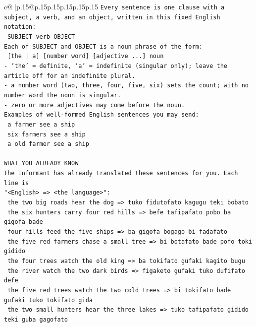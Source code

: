 \documentclass{article}
\begin{document}
{\begin{supertabular}{c@{$\;$}|p{.15\linewidth}@{}p{.15\linewidth}p{.15\linewidth}p{.15\linewidth}p{.15\linewidth}p{.15\linewidth}}
{{{\texttt{Every sentence is one clause with a subject, a verb, and an object, written in this fixed English notation:} \\
\texttt{    SUBJECT  verb  OBJECT} \\
\texttt{Each of SUBJECT and OBJECT is a noun phrase of the form:} \\
\texttt{    {[}the | a{]}  {[}number word{]}  {[}adjective ...{]}  noun} \\
\texttt{{-} 'the' = definite, 'a' = indefinite (singular only); leave the article off for an indefinite plural.} \\
\texttt{{-} a number word (two, three, four, five, six) sets the count; with no number word the noun is singular.} \\
\texttt{{-} zero or more adjectives may come before the noun.} \\
\texttt{Examples of well{-}formed English sentences you may send:} \\
\texttt{    a farmer see a ship} \\
\texttt{    six farmers see a ship} \\
\texttt{    a old farmer see a ship} \\
\\ 
\texttt{WHAT YOU ALREADY KNOW} \\
\texttt{The informant has already translated these sentences for you. Each line is} \\
\texttt{"<English>  =>  <the language>":} \\
\texttt{    the two big roads hear the dog  =>  tuko fidutofato kagugu teki bobato} \\
\texttt{    the six hunters carry four red hills  =>  befe tafipafato pobo ba gigofa bade} \\
\texttt{    four hills feed the five ships  =>  ba gigofa bogago bi fadafato} \\
\texttt{    the five red farmers chase a small tree  =>  bi botafato bade pofo toki gidido} \\
\texttt{    the four trees watch the old king  =>  ba tokifato gufaki kagito bugu} \\
\texttt{    the river watch the two dark birds  =>  figaketo gufaki tuko dufifato defe} \\
\texttt{    the five red trees watch the two cold trees  =>  bi tokifato bade gufaki tuko tokifato gida} \\
\texttt{    the two small hunters hear the three lakes  =>  tuko tafipafato gidido teki guba gagofato} \\
}}}
\end{supertabular}}
\end{document}
